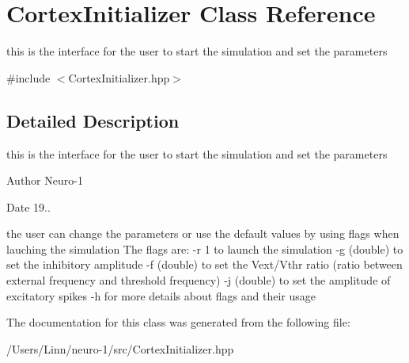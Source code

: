 \hypertarget{class_cortex_initializer}{}\section{Cortex\+Initializer Class Reference}
\label{class_cortex_initializer}


this is the interface for the user to start the simulation and set the parameters  




{\ttfamily \#include $<$Cortex\+Initializer.\+hpp$>$}



\subsection{Detailed Description}
this is the interface for the user to start the simulation and set the parameters 

\begin{DoxyAuthor}{Author}
Neuro-\/1
\end{DoxyAuthor}
\begin{DoxyDate}{Date}
19..
\end{DoxyDate}

\begin{DoxyItemize}
\item 
\end{DoxyItemize}

the user can change the parameters or use the default values by using flags when lauching the simulation The flags are\+: -\/r 1 to launch the simulation -\/g (double) to set the inhibitory amplitude -\/f (double) to set the Vext/\+Vthr ratio (ratio between external frequency and threshold frequency) -\/j (double) to set the amplitude of excitatory spikes -\/h for more details about flags and their usage 

The documentation for this class was generated from the following file\+:\begin{DoxyCompactItemize}
\item 
/\+Users/\+Linn/neuro-\/1/src/Cortex\+Initializer.\+hpp\end{DoxyCompactItemize}
